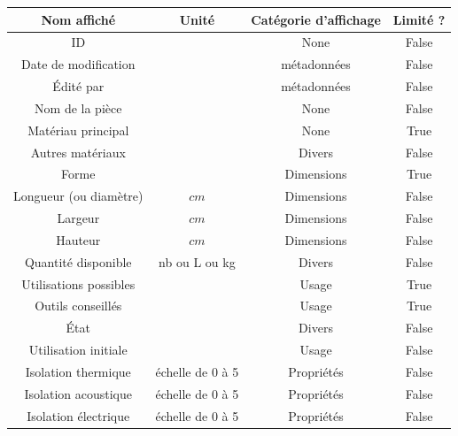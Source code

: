 \documentclass[12pt,a4paper]{article}
\begin{document}
    \begin{table}
        \begin{center}
            \footnotesize
            \begin{tabular}{|c|c|c|c|}
                \hline
                Nom affiché & Unité & Catégorie d'affichage & Limité ? \\
                \hline
                ID &   & None & False \\
                \hline
                Date de modification &   & métadonnées & False \\
                \hline
                Édité par &   & métadonnées & False \\
                \hline
                Nom de la pièce &   & None & False \\
                \hline
                Matériau principal &   & None & True \\
                \hline
                Autres matériaux &   & Divers & False \\
                \hline
                Forme &   & Dimensions & True \\
                \hline
                Longueur (ou diamètre) & $cm$ & Dimensions & False \\
                \hline
                Largeur & $cm$ & Dimensions & False \\
                \hline
                Hauteur & $cm$ & Dimensions & False \\
                \hline
                Quantité disponible & nb ou L ou kg & Divers & False \\
                \hline
                Utilisations possibles &   & Usage & True \\
                \hline
                Outils conseillés &   & Usage & True \\
                \hline
                État &   & Divers & False \\
                \hline
                Utilisation initiale &   & Usage & False \\
                \hline
                Isolation thermique & échelle de 0 à 5 & Propriétés & False \\
                \hline
                Isolation acoustique & échelle de 0 à 5 & Propriétés & False \\
                \hline
                Isolation électrique & échelle de 0 à 5 & Propriétés & False \\
                \hline

\end{tabular}
\end{center}
\end{table}
\end{document}

